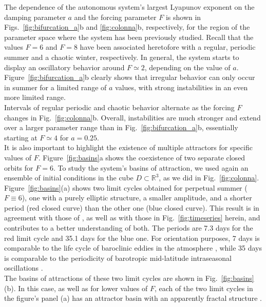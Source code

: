 \documentclass[%
 aip, cha,
 amsmath,amssymb,
 reprint,%
author-year,%
]{revtex4-1}
\newcommand{\0}{\mathbf 0}
\begin{document}
The dependence of the autonomous system's largest Lyapunov exponent on the damping parameter $a$ and the forcing parameter $F$ is shown in Figs.~\ref{fig:bifurcation_a}b and \ref{fig:colonna}b, respectively, for the region of the parameter space where the system has been previously studied. Recall that the values $F=6$ and $F=8$ have been associated heretofore with a regular, periodic summer and a chaotic winter, respectively. In general, the system starts to display an oscillatory behavior around $F \simeq 2$, depending on the value of $a.$
Figure~\ref{fig:bifurcation_a}b clearly shows that irregular behavior can only occur in summer for a limited range of $a$ values, with strong instabilities in an even more limited range. \\
Intervals of regular periodic and chaotic behavior alternate as the forcing $F$ changes in Fig.~\ref{fig:colonna}b. Overall, instabilities are much stronger and extend over a larger parameter range than in Fig.~\ref{fig:bifurcation_a}b, essentially starting at $F \simeq 4$ for $a = 0.25$.  \\
 It is also important to highlight the existence of multiple attractors for specific values of $F$. Figure~\ref{fig:basins}a shows the coexistence of two separate closed orbits for $F=6$. To study the system's basins of attraction, we used again an ensemble of initial conditions in the cube $D \subset \mathbb{R}^3$, as we did in Fig.~\ref{fig:colonna}. \\
Figure~\ref{fig:basins}(a) shows two limit cycles obtained for perpetual summer ($F \equiv 6$), one with a purely elliptic structure, a smaller amplitude, and a shorter period (red closed curve) than the other  one (blue closed curve). This result is in agreement with those of \cite{lorenz90}, as well as with those in Fig.~\ref{fig:timeseries} herein, and contributes to a better understanding of both. The periods are 7.3 days for the red limit cycle and 35.1 days for the blue one. For orientation purposes, 7 days is comparable to the life cycle of baroclinic eddies in the atmosphere \citep{Kalnay.2003}, while 35 days is comparable to the periodicity of barotropic mid-latitude intraseasonal oscillations \citep{ghil_S2S}.\\
The basins of attractions of these two limit cycles are shown in Fig.~\ref{fig:basins}(b). In this case, as well as for lower values of $F$, each of the two limit cycles in the figure's panel (a) has an attractor basin with an apparently fractal structure \citep{Grebogi.ea.1987}. 
\end{document}
